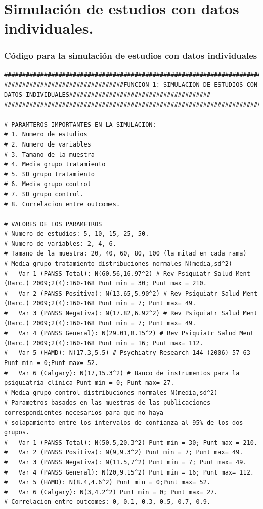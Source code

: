 \documentclass[a4paper,openright,12pt]{report}
\begin{document}
\section{Simulación de estudios con datos individuales.}
\subsubsection{Código para la simulación de estudios con datos individuales}
{\tiny
\begin{verbatim}
################################################################################################################################
#################################FUNCION 1: SIMULACION DE ESTUDIOS CON DATOS INDIVIDUALES#######################################
################################################################################################################################

# PARAMTEROS IMPORTANTES EN LA SIMULACION:
# 1. Numero de estudios
# 2. Numero de variables
# 3. Tamano de la muestra
# 4. Media grupo tratamiento
# 5. SD grupo tratamiento
# 6. Media grupo control
# 7. SD grupo control.
# 8. Correlacion entre outcomes.

# VALORES DE LOS PARAMETROS
# Numero de estudios: 5, 10, 15, 25, 50.
# Numero de variables: 2, 4, 6.
# Tamano de la muestra: 20, 40, 60, 80, 100 (la mitad en cada rama) 
# Media grupo tratamiento distribuciones normales N(media,sd^2)
#   Var 1 (PANSS Total): N(60.56,16.97^2) # Rev Psiquiatr Salud Ment (Barc.) 2009;2(4):160-168 Punt min = 30; Punt max = 210.
#   Var 2 (PANSS Positiva): N(13.65,5.90^2) # Rev Psiquiatr Salud Ment (Barc.) 2009;2(4):160-168 Punt min = 7; Punt max= 49.
#   Var 3 (PANSS Negativa): N(17.82,6.92^2) # Rev Psiquiatr Salud Ment (Barc.) 2009;2(4):160-168 Punt min = 7; Punt max= 49.
#   Var 4 (PANSS General): N(29.01,8.15^2) # Rev Psiquiatr Salud Ment (Barc.) 2009;2(4):160-168 Punt min = 16; Punt max= 112.
#   Var 5 (HAMD): N(17.3,5.5) # Psychiatry Research 144 (2006) 57-63 Punt min = 0;Punt max= 52.
#   Var 6 (Calgary): N(17,15.3^2) # Banco de instrumentos para la psiquiatria clinica Punt min = 0; Punt max= 27.
# Media grupo control distribuciones normales N(media,sd^2)
# Parametros basados en las muestras de las publicaciones correspondientes necesarios para que no haya
# solapamiento entre los intervalos de confianza al 95% de los dos grupos.
#   Var 1 (PANSS Total): N(50.5,20.3^2) Punt min = 30; Punt max = 210.
#   Var 2 (PANSS Positiva): N(9,9.3^2) Punt min = 7; Punt max= 49.
#   Var 3 (PANSS Negativa): N(11.5,7^2) Punt min = 7; Punt max= 49.
#   Var 4 (PANSS General): N(20,9.15^2) Punt min = 16; Punt max= 112.
#   Var 5 (HAMD): N(8.4,4.6^2) Punt min = 0;Punt max= 52.
#   Var 6 (Calgary): N(3,4.2^2) Punt min = 0; Punt max= 27.
# Correlacion entre outcomes: 0, 0.1, 0.3, 0.5, 0.7, 0.9. 


\end{verbatim}}
\end{document}
